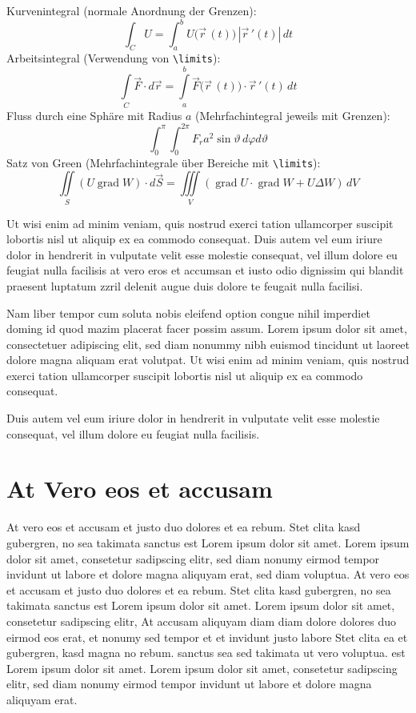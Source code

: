 \documentclass[ %
	DIV=15, %
	BCOR=14mm, %
	parskip=half, %
	headsepline, %
	cleardoublepage=empty, %
	tablecaptionabove, %
	toc=bib, %
	toc=listofnumbered, %
	listof=leveldown, %
	numbers=noendperiod %
	]{scrbook}
\begin{document}
Kurvenintegral (normale Anordnung der Grenzen):
  \[
    \int_C U = \int_a^b U \big(\vec{r}\,(t)\big)\,|\vec{r}\,'(t)|\,dt
  \]
  Arbeitsintegral (Verwendung von \verb|\limits|):
  \[
    \int\limits_C \vec{F} \cdot d\vec{r} 
      =\int\limits_a^b \vec{F} \big(\vec{r}\,(t)\big)
      \cdot \vec{r}\,'(t)\,dt
  \]
  Fluss durch eine Sphäre mit Radius $a$ (Mehrfachintegral jeweils mit Grenzen):
  \[
    \int_0^\pi \int_0^{2\pi} F_r a^2 \sin\vartheta \, d\varphi d\vartheta
  \]
  Satz von Green (Mehrfachintegrale über Bereiche mit \verb|\limits|):
  \[
    \iint\limits_S (U \operatorname{grad} W)\cdot d\vec{S} 
    =\iiint\limits_V (\operatorname{grad} U\cdot 
     \operatorname{grad} W +U\Delta W)\,dV
  \]

Ut wisi enim ad minim veniam, quis nostrud exerci tation ullamcorper suscipit lobortis nisl ut aliquip ex ea commodo consequat. Duis autem vel eum iriure dolor in hendrerit in vulputate velit esse molestie consequat, vel illum dolore eu feugiat nulla facilisis at vero eros et accumsan et iusto odio dignissim qui blandit praesent luptatum zzril delenit augue duis dolore te feugait nulla facilisi. 

Nam liber tempor cum soluta nobis eleifend option congue nihil imperdiet doming id quod mazim placerat facer possim assum. Lorem ipsum dolor sit amet, consectetuer adipiscing elit, sed diam nonummy nibh euismod tincidunt ut laoreet dolore magna aliquam erat volutpat. Ut wisi enim ad minim veniam, quis nostrud exerci tation ullamcorper suscipit lobortis nisl ut aliquip ex ea commodo consequat. 

Duis autem vel eum iriure dolor in hendrerit in vulputate velit esse molestie consequat, vel illum dolore eu feugiat nulla facilisis.


\section{At Vero eos et accusam} %
\label{sec:at_vero_eos_et_accusam}

At vero eos et accusam et justo duo dolores et ea rebum. Stet clita kasd gubergren, no sea takimata sanctus est Lorem ipsum dolor sit amet. Lorem ipsum dolor sit amet, consetetur sadipscing elitr, sed diam nonumy eirmod tempor invidunt ut labore et dolore magna aliquyam erat, sed diam voluptua. At vero eos et accusam et justo duo dolores et ea rebum. Stet clita kasd gubergren, no sea takimata sanctus est Lorem ipsum dolor sit amet. Lorem ipsum dolor sit amet, consetetur sadipscing elitr, At accusam aliquyam diam diam dolore dolores duo eirmod eos erat, et nonumy sed tempor et et invidunt justo labore Stet clita ea et gubergren, kasd magna no rebum. sanctus sea sed takimata ut vero voluptua. est Lorem ipsum dolor sit amet. Lorem ipsum dolor sit amet, consetetur sadipscing elitr, sed diam nonumy eirmod tempor invidunt ut labore et dolore magna aliquyam erat.
\end{document}
